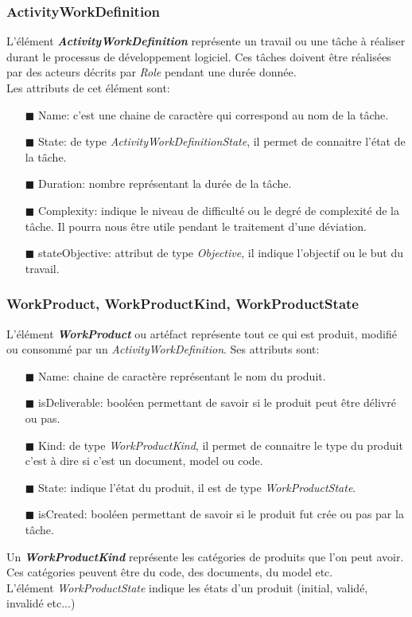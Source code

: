 \subsubsection*{ActivityWorkDefinition}
L'élément \textbf{\textit{ActivityWorkDefinition}} représente un travail ou une tâche à réaliser durant le processus de développement logiciel. Ces tâches doivent être réalisées par des acteurs décrits par \textit{Role} pendant une durée donnée.\\
Les attributs de cet élément sont:\\
\begin{itemize}
\item[\tiny{$\blacksquare$}] Name: c'est une chaine de caractère qui correspond au nom de la tâche.
\item[\tiny{$\blacksquare$}] State: de type \textit{ActivityWorkDefinitionState}, il permet de connaitre l'état de la tâche.
\item[\tiny{$\blacksquare$}] Duration: nombre représentant la durée de la tâche.
\item[\tiny{$\blacksquare$}] Complexity: indique le niveau de difficulté ou le degré de complexité de la tâche. Il pourra nous être utile pendant le traitement d'une déviation.
\item[\tiny{$\blacksquare$}] stateObjective: attribut de type \textit{Objective}, il indique l'objectif ou le but du travail.
\end{itemize}
\subsubsection*{WorkProduct, WorkProductKind, WorkProductState}
L'élément \textbf{\textit{WorkProduct}} ou artéfact représente tout ce qui est produit, modifié ou consommé par un \textit{ActivityWorkDefinition}. Ses attributs sont:\\
\begin{itemize}
\item[\tiny{$\blacksquare$}] Name: chaine de caractère représentant le nom du produit.
\item[\tiny{$\blacksquare$}] isDeliverable: booléen permettant de savoir si le produit peut être délivré ou pas.
\item[\tiny{$\blacksquare$}] Kind: de type \textit{WorkProductKind}, il permet de connaitre le type du produit c'est à dire si c'est un document, model ou code.
\item[\tiny{$\blacksquare$}] State: indique l'état du produit, il est de type \textit{WorkProductState}.
\item[\tiny{$\blacksquare$}] isCreated: booléen permettant de savoir si le produit fut crée ou pas par la tâche.
\end{itemize}
Un \textbf{\textit{WorkProductKind}} représente les catégories de produits que l'on peut avoir. Ces catégories peuvent être du code, des documents, du model etc.\\
L'élément \textit{WorkProductState} indique les états d'un produit (initial, validé, invalidé etc...)

